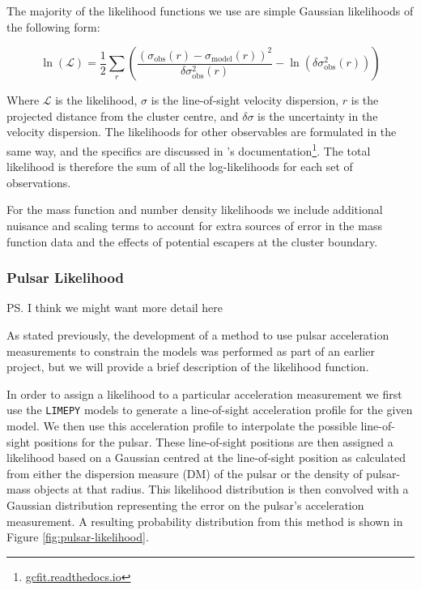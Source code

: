 The majority of the likelihood functions we use are simple Gaussian likelihoods of the following
form:

\begin{equation}
    \ln \left(\mathcal{L}\right)=\frac{1}{2}
    \sum_{r}\left(\frac{\left(\sigma_{\mathrm{obs}}(r)
        -\sigma_{\mathrm{model}}(r)\right)^{2}}{\delta \sigma_{\mathrm{obs}}^{2}(r)}
    -\ln \left(\delta \sigma_{\mathrm{obs}}^{2}(r)\right)\right)
\end{equation}

Where $\mathcal{L}$ is the likelihood, $\sigma$ is the line-of-sight velocity dispersion, $r$ is the
projected distance from the cluster centre, and $\delta \sigma$ is the uncertainty in the velocity
dispersion. The likelihoods for other observables are formulated in the same way, and the specifics
are discussed in 's documentation\footnote{\url{gcfit.readthedocs.io}}. The total
likelihood is therefore the sum of all the log-likelihoods for each set of observations.

For the mass function and number density likelihoods we include additional nuisance and scaling
terms to account for extra sources of error in the mass function data and the effects of potential
escapers at the cluster boundary.

\subsubsection{Pulsar Likelihood}

\ps{I think we might want more detail here}

As stated previously, the development of a method to use pulsar acceleration measurements to
constrain the models was performed as part of an earlier project, but we will provide a brief
description of the likelihood function.

In order to assign a likelihood to a particular acceleration measurement we first use the
\texttt{LIMEPY} models to generate a line-of-sight acceleration profile for the given model. We then
use this acceleration profile to interpolate the possible line-of-sight positions for the pulsar.
These line-of-sight positions are then assigned a likelihood based on a Gaussian centred at the
line-of-sight position as calculated from either the dispersion measure (DM) of the pulsar or the
density of pulsar-mass objects at that radius. This likelihood distribution is then convolved with a
Gaussian distribution representing the error on the pulsar's acceleration measurement. A resulting
probability distribution from this method is shown in Figure \ref{fig:pulsar-likelihood}.

